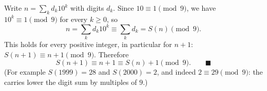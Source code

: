 Write $n=\sum_k d_k10^k$ with digits $d_k$. Since $10\equiv1\pmod9$, we have $10^k\equiv1\pmod 9$ for every $k\ge0$, so
\[
n=\sum_k d_k10^k\equiv\sum_k d_k=S(n)\pmod 9 .
\]
This holds for every positive integer, in particular for $n+1$: $S(n+1)\equiv n+1\pmod 9$. Therefore
\[
S(n+1)\equiv n+1\equiv S(n)+1\pmod 9 .\qquad\blacksquare
\]
(For example $S(1999)=28$ and $S(2000)=2$, and indeed $2\equiv29\pmod9$: the carries lower the digit sum by multiples of $9$.)
